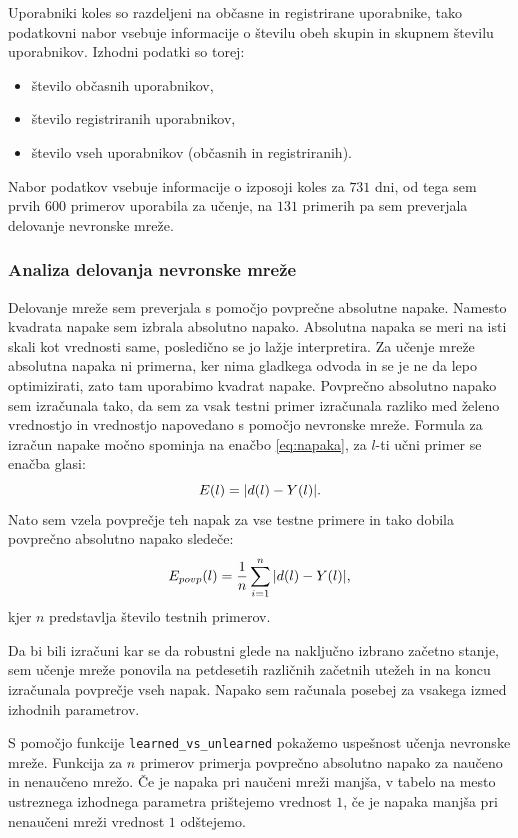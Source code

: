 \documentclass[mat1]{fmfdelo}
\begin{document}
Uporabniki koles so razdeljeni na občasne in registrirane uporabnike, tako podatkovni nabor vsebuje informacije o številu obeh skupin in skupnem številu uporabnikov. Izhodni podatki so torej:
\begin{itemize}
	\item število občasnih uporabnikov,
	\item število registriranih uporabnikov,
	\item število vseh uporabnikov (občasnih in registriranih).
\end{itemize}

Nabor podatkov vsebuje informacije o izposoji koles za $731$ dni, od tega sem prvih $600$ primerov uporabila za učenje, na $131$ primerih pa sem preverjala delovanje nevronske mreže.
%
\subsubsection{Analiza delovanja nevronske mreže}
Delovanje mreže sem preverjala s pomočjo povprečne absolutne napake. Namesto kvadrata napake sem izbrala absolutno napako. Absolutna napaka se meri na isti skali kot vrednosti same, posledično se jo lažje interpretira. Za učenje mreže absolutna napaka ni primerna, ker nima gladkega odvoda in se je ne da lepo optimizirati, zato tam uporabimo kvadrat napake. Povprečno absolutno napako sem izračunala tako, da sem za vsak testni primer izračunala razliko med želeno vrednostjo in vrednostjo napovedano s pomočjo nevronske mreže. Formula za izračun napake močno spominja na enačbo \eqref{eq:napaka}, za $l$-ti učni primer se enačba glasi:
%
\begin{equation*}
E(l) = |d(l)-Y(l)|\text.
\end{equation*}
%
 Nato sem vzela povprečje teh napak za vse testne primere in tako dobila povprečno absolutno napako sledeče:
 \begin{equation}
 E_{povp}(l) = \frac{1}{n}\sum_{i=1}^{n}|d(l)-Y(l)|\text,
 \end{equation}
 kjer $n$ predstavlja število testnih primerov.
 
  Da bi bili izračuni kar se da robustni glede na naključno izbrano začetno stanje, sem učenje mreže ponovila na petdesetih različnih začetnih utežeh in na koncu izračunala povprečje vseh napak. Napako sem računala posebej za vsakega izmed izhodnih parametrov.

S pomočjo funkcije \texttt{learned\-\_vs\-\_unlearned} pokažemo uspešnost učenja nevronske mreže. Funkcija za $n$ primerov primerja povprečno absolutno napako za naučeno in nenaučeno mrežo. Če je napaka pri naučeni mreži manjša, v tabelo na mesto ustreznega izhodnega parametra prištejemo vrednost $1$, če je napaka manjša pri nenaučeni mreži vrednost $1$ odštejemo.
\end{document}
